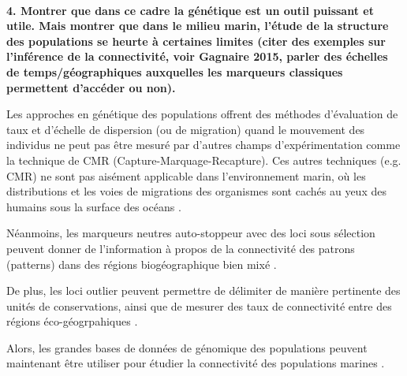 \documentclass[a4paper,11pt,twoside]{report}
\begin{document}
~~\\
\textbf{4. Montrer que dans ce cadre la génétique est un outil puissant et utile. Mais montrer que dans le milieu marin, l'étude de la structure des populations se heurte à certaines limites (citer des exemples sur l'inférence de la connectivité, voir Gagnaire 2015, parler des échelles de temps/géographiques auxquelles les marqueurs classiques permettent d'accéder ou non).}

Les approches en génétique des populations offrent des méthodes d'évaluation de taux et d'échelle de dispersion (ou de migration) quand le mouvement des individus ne peut pas être mesuré par d'autres champs d'expérimentation comme la technique de CMR (Capture-Marquage-Recapture). Ces autres techniques (e.g. CMR) ne sont pas aisément applicable dans l'environnement marin, où les distributions et les voies de migrations des organismes sont cachés au yeux des humains sous la surface des océans\citep{hellberg2009gene} \citep{selkoe2011marine} \citep{Gagnaire:2015aa}.


Néanmoins, les marqueurs neutres auto-stoppeur avec des loci sous sélection peuvent donner de l'information à propos de la connectivité des patrons (patterns) dans des régions biogéographique bien mixé \citep{Gagnaire:2015aa}.

De plus, les loci outlier peuvent permettre de délimiter de manière pertinente des unités de conservations, ainsi que de mesurer des taux de connectivité entre des régions éco-géogrpahiques \citep{Gagnaire:2015aa}. 

Alors, les grandes bases de données de génomique des populations peuvent maintenant être utiliser pour étudier la connectivité des populations marines \citep{Gagnaire:2015aa}.
\end{document}
